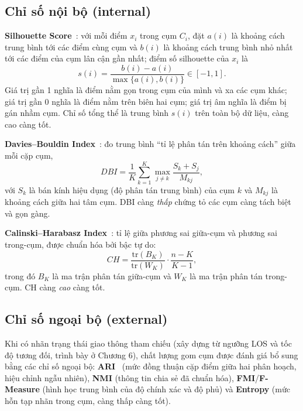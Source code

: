 \subsection{Chỉ số nội bộ (internal)}
\textbf{Silhouette Score}~\cite{rousseeuw}: với mỗi điểm $x_i$ trong cụm $C_i$, đặt $a(i)$ là khoảng cách trung bình tới các điểm cùng cụm và $b(i)$ là khoảng cách trung bình nhỏ nhất tới các điểm của cụm lân cận gần nhất; điểm số silhouette của $x_i$ là
\begin{equation}
s(i) = \frac{b(i) - a(i)}{\max\{a(i), b(i)\}} \in [-1, 1].
\label{eq:sil}
\end{equation}
Giá trị gần 1 nghĩa là điểm nằm gọn trong cụm của mình và xa các cụm khác; giá trị gần 0 nghĩa là điểm nằm trên biên hai cụm; giá trị âm nghĩa là điểm bị gán nhầm cụm. Chỉ số tổng thể là trung bình $s(i)$ trên toàn bộ dữ liệu, càng cao càng tốt.

\textbf{Davies--Bouldin Index}~\cite{davies}: đo trung bình ``tỉ lệ phân tán trên khoảng cách'' giữa mỗi cặp cụm,
\begin{equation}
DBI = \frac{1}{K} \sum_{k=1}^{K} \max_{j \neq k} \frac{S_k + S_j}{M_{kj}},
\label{eq:dbi}
\end{equation}
với $S_k$ là bán kính hiệu dụng (độ phân tán trung bình) của cụm $k$ và $M_{kj}$ là khoảng cách giữa hai tâm cụm. DBI càng \textit{thấp} chứng tỏ các cụm càng tách biệt và gọn gàng.

\textbf{Calinski--Harabasz Index}~\cite{calinski}: tỉ lệ giữa phương sai giữa-cụm và phương sai trong-cụm, được chuẩn hóa bởi bậc tự do:
\begin{equation}
CH = \frac{\mathrm{tr}(B_K)}{\mathrm{tr}(W_K)} \cdot \frac{n - K}{K - 1},
\label{eq:ch}
\end{equation}
trong đó $B_K$ là ma trận phân tán giữa-cụm và $W_K$ là ma trận phân tán trong-cụm. CH càng \textit{cao} càng tốt.

\subsection{Chỉ số ngoại bộ (external)}
Khi có nhãn trạng thái giao thông tham chiếu (xây dựng từ ngưỡng LOS và tốc độ tương đối, trình bày ở Chương 6), chất lượng gom cụm được đánh giá bổ sung bằng các chỉ số ngoại bộ: \textbf{ARI}~\cite{hubert} (mức đồng thuận cặp điểm giữa hai phân hoạch, hiệu chỉnh ngẫu nhiên), \textbf{NMI} (thông tin chia sẻ đã chuẩn hóa), \textbf{FMI}/\textbf{F-Measure} (hình học trung bình của độ chính xác và độ phủ) và \textbf{Entropy} (mức hỗn tạp nhãn trong cụm, càng thấp càng tốt).

